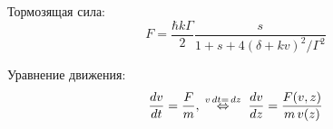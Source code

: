 \begin{minipage}{0.31\textwidth}

Тормозящая сила:
\begin{equation*}
    F = \frac{\hbar k \Gamma}{2} \frac{s}{1+s+4({\delta}+k v)^2/\Gamma^2}
\end{equation*}

\phantom{42}

Уравнение движения:
\begin{equation*}
    \frac{d v}{d t} = \frac{F}{m},
    \hspace{0.1cm} \overset{v \, d t = \, d z}{\Leftrightarrow}  \hspace{0.1cm}
    \frac{d v}{d z} = \frac{F(v, z)}{m \, v(z)}
\end{equation*}



\end{minipage}